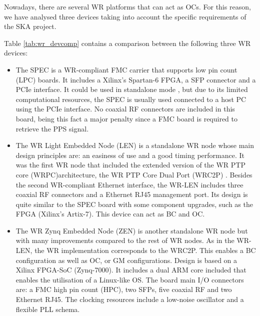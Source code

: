Nowadays, there  are several WR platforms that can act as OCs. 
For this reason, we have analysed three devices taking into account the specific requirements of the SKA project.

Table \ref{tab:wr_devcomp} contains a comparison between the following three WR
devices: 

\begin{itemize} 
	\item The SPEC \cite{ohwr:spec} is a WR-compliant FMC carrier that supports low pin count (LPC) boards. It includes a Xilinx's Spartan-6 FPGA, a SFP connector and a PCIe interface. It could be used in standalone mode \cite{migueljl-paper-wr-spec}, but due to its limited computational resources, the SPEC is usually used connected to a host PC using the PCIe interface.  No coaxial RF connectors are included in this board, being this fact a major penalty since a FMC board is required to retrieve the PPS signal.
	
	\item The WR Light Embedded Node (LEN) \cite{sevensols:wr_len} is a 	standalone WR node whose main design principles are: an easiness of use and a good timing performance. It was the first WR node	that included the extended version of the WR PTP core (WRPC)architecture, the WR PTP Core Dual Port (WRC2P) \cite{torres2016scalability}. Besides the second WR-compliant Ethernet interface, the WR-LEN includes three coaxial RF
	connectors and a Ethernet RJ45 management port. Its design is quite similar to the SPEC board with some component upgrades, such as the FPGA (Xilinx's Artix-7). This device can act as BC and OC.
	
	\item The WR Zynq Embedded Node (ZEN) \cite{sevensols:wr_zen} is another
	standalone WR node but with many improvements compared to the rest of WR nodes. As in the WR-LEN, the WR implementation corresponds to the WRC2P.  This enables a BC configuration as well as OC, or GM configurations. Design is based on a Xilinx FPGA-SoC (Zynq-7000). It includes a dual ARM core included that enables the utilisation of a Linux-like	OS. The board main I/O connectors are: a FMC high pin count (HPC), two SFPs, five coaxial RF and two Ethernet RJ45. The clocking resources include a low-noise oscillator and a flexible PLL schema.
\end{itemize}

